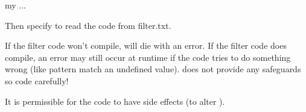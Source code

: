 \documentclass[letterpaper,10pt,english]{sphinxmanual}
\begin{document}
\begin{fulllineitems}
\begin{sphinxVerbatim}[commandchars=\\\{\}]
my   ...        
\end{sphinxVerbatim}

Then specify  to read the code from filter.txt.

If the filter code won’t compile,  will die with an error.
If the filter code does compile, an error may still occur at runtime if the
code tries to do something wrong (like pattern match an undefined value).
 does not provide any safeguards so code carefully!

It is permissible for the code to have side effects (to alter ).

\end{fulllineitems}

\end{document}
